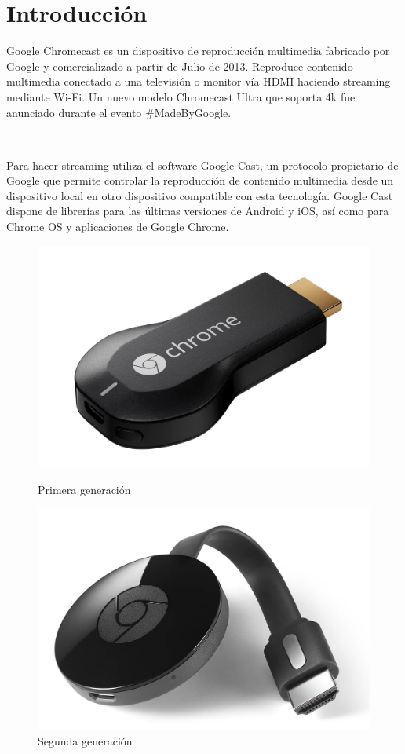 \section{Introducción}
Google Chromecast es un dispositivo de reproducción multimedia fabricado por Google y comercializado a partir de Julio de 2013. Reproduce contenido multimedia conectado a una televisión o monitor vía HDMI haciendo streaming mediante Wi-Fi. Un nuevo modelo Chromecast Ultra que soporta 4k fue anunciado durante el evento \#MadeByGoogle.

\

Para hacer streaming utiliza el software Google Cast, un protocolo propietario de Google que permite controlar la reproducción de contenido multimedia desde un dispositivo local en otro dispositivo compatible con esta tecnología. Google Cast dispone de librerías para las últimas versiones de Android y iOS, así como para Chrome OS y aplicaciones de Google Chrome.

\begin{figure}[h]
	\centering
	\begin{minipage}[b]{.35\textwidth}
		\includegraphics[scale=0.11]{./Imagenes/chromecast1gen.jpg}
		\caption{Primera generación}\label{fig:1gen}
	\end{minipage}\qquad
	\hspace{1cm}
	\begin{minipage}[b]{.35\textwidth}
		\includegraphics[scale=0.15]{./Imagenes/Chromecast.jpg}
		\caption{Segunda generación}\label{fig:2gen}
	\end{minipage}
\end{figure}

